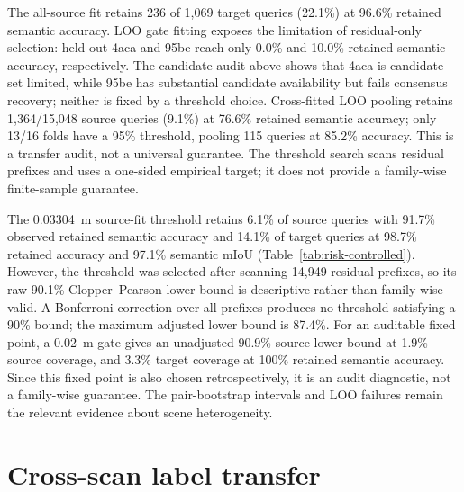 \documentclass[10pt,twocolumn]{article}
\begin{document}
The all-source fit retains 236 of 1,069 target queries (22.1\%) at 96.6\%
retained semantic accuracy. LOO gate fitting exposes the limitation of residual-only
selection: held-out 4aca and 95be reach only 0.0\% and 10.0\% retained
semantic accuracy, respectively. The candidate audit above shows that 4aca is
candidate-set limited, while 95be has substantial candidate availability but
fails consensus recovery; neither is fixed by a threshold choice. Cross-fitted
LOO pooling retains 1,364/15,048 source queries (9.1\%) at 76.6\% retained
semantic accuracy; only 13/16 folds have a 95\% threshold, pooling 115 queries
at 85.2\% accuracy. This is a transfer audit, not a universal guarantee. The
threshold search scans residual prefixes and uses a one-sided empirical target;
it does not provide a family-wise finite-sample guarantee.

The 0.03304~m source-fit threshold retains 6.1\% of source queries with 91.7\%
observed retained semantic accuracy and 14.1\% of target queries at 98.7\% retained accuracy and
97.1\% semantic mIoU (Table~\ref{tab:risk-controlled}). However, the threshold
was selected after scanning 14,949 residual prefixes, so its raw 90.1\%
Clopper--Pearson lower bound is descriptive rather than family-wise valid. A
Bonferroni correction over all prefixes produces no threshold satisfying a 90\%
bound; the maximum adjusted lower bound is 87.4\%. For an auditable fixed
point, a 0.02~m gate gives an unadjusted 90.9\% source lower bound at 1.9\%
source coverage, and 3.3\% target coverage at 100\% retained semantic accuracy. Since
this fixed point is also chosen retrospectively, it is an audit diagnostic,
not a family-wise guarantee. The pair-bootstrap intervals and LOO failures
remain the relevant evidence about scene heterogeneity.

\begin{table}[t]
\centering
\scriptsize
\resizebox{\columnwidth}{!}{}
\caption{Residual operating points. The source-fit row reports a raw
post-selection lower bound; the fixed 2~cm row reports an unadjusted
fixed-threshold query-level LCB. Neither is a family-wise guarantee after
retrospective threshold inspection.}
\label{tab:risk-controlled}
\end{table}

\section{Cross-scan label transfer}
\end{document}
